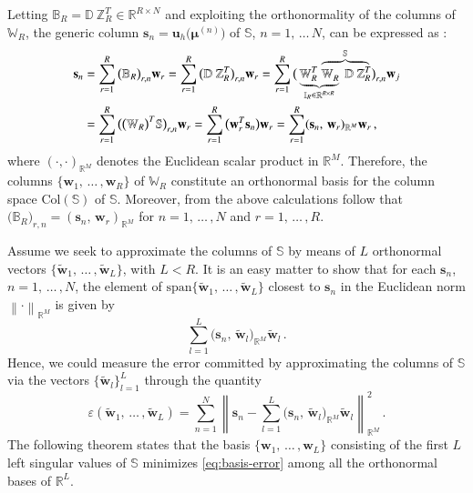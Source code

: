 \documentclass{elsarticle}
\theoremstyle{theorem}
\theoremstyle{definition}
\theoremstyle{remark}
\theoremstyle{proposition}
\numberwithin{figure}{section}
\newcommand{\norm}[1]{\left\lVert#1\right\rVert}
\newcommand{\wt}[1]{\widetilde{#1}}
\newcommand{\bg}[1]{\boldsymbol{#1}}
\begin{document}
		Letting $\mathbb{B}_R^{} = \mathbb{D} ~ \mathbb{Z}_R^T \in \mathbb{R}^{R \times N}$ and exploiting the orthonormality of the columns of $\mathbb{W}_R$, the generic column $\mathbf{s}_n = \mathbf{u}_h \big( \bg{\mu}^{(n)} \big)$ of $\mathbb{S}$, $n = 1, \, \ldots \, N$, can be expressed as \cite{Vol08}:
		\begin{equation*}
			\begin{aligned}
				\mathbf{s}_n & = \sum_{r = 1}^R \big( \mathbb{B}_R \big)_{r,n} \mathbf{w}_r = \sum_{r = 1}^R \big( \mathbb{D} ~ \mathbb{Z}_R^T \big)_{r,n} \mathbf{w}_r = \sum_{r = 1}^R \big( \underbrace{ \mathbb{W}_R^T ~ \lefteqn{\overbrace{\phantom{\mathbb{W}_R ~ \mathbb{D} ~ \mathbb{Z}_R^T}}^{\mathbb{S}}} \mathbb{W}_R^{}}_{\mathbb{I}_R \in \mathbb{R}^{R \times R}} ~ \mathbb{D} ~ \mathbb{Z}_R^T \big)_{r,n} \mathbf{w}_j \\
				& = \sum_{r = 1}^R \big( \big( \mathbb{W}_R \big)^T \mathbb{S} \big)_{r,n} \mathbf{w}_r = \sum_{r = 1}^R \big( \mathbf{w}_r^T \mathbf{s}_n \big) \mathbf{w}_r = \sum_{r = 1}^R (\mathbf{s}_n, \, \mathbf{w}_r)_{\mathbb{R}^M} \mathbf{w}_r \, ,
			\end{aligned}
		\end{equation*}
		where $(\cdot,\cdot)_{\mathbb{R}^M}$ denotes the Euclidean scalar product in $\mathbb{R}^M$. Therefore, the columns $\big\lbrace \mathbf{w}_1, \, \ldots \, , \mathbf{w}_R \big\rbrace$ of $\mathbb{W}_R$ constitute an orthonormal basis for the column space $\text{Col}(\mathbb{S})$ of $\mathbb{S}$. Moreover, from the above calculations follow that $\big( \mathbb{B}_R \big)_{r,n} = (\mathbf{s}_n, \, \mathbf{w}_r)_{\mathbb{R}^M}$ for $n = 1, \, \ldots \, , N$ and $r = 1, \, \ldots \, , R$.
		
		Assume we seek to approximate the columns of $\mathbb{S}$ by means of $L$ orthonormal vectors $\big\lbrace \wt{\mathbf{w}}_1, \, \ldots \, , \wt{\mathbf{w}}_L \big\rbrace$, with $L < R$. It is an easy matter to show that for each $\mathbf{s}_n$, $n = 1, \, \ldots \, , N$, the element of $\text{span} \big\lbrace \wt{\mathbf{w}}_1, \, \ldots \, , \wt{\mathbf{w}}_L \big\rbrace$ closest to $\mathbf{s}_n$ in the Euclidean norm $\norm{\cdot}_{\mathbb{R}^M}$ is given by
		\begin{equation*}
			\sum_{l = 1}^L \big( \mathbf{s}_n, \, \wt{\mathbf{w}}_l \big)_{\mathbb{R}^M} \wt{\mathbf{w}}_l \, .
		\end{equation*} 
		Hence, we could measure the error committed by approximating the columns of $\mathbb{S}$ via the vectors $\big\lbrace \wt{\mathbf{w}}_l \big\rbrace_{l = 1}^L$ through the quantity
		\begin{equation}
			\label{eq:basis-error}
			\varepsilon(\wt{\mathbf{w}}_1, \, \ldots \, , \wt{\mathbf{w}}_L) = \sum_{n = 1}^N \norm{\mathbf{s}_n - \sum_{l = 1}^L \big( \mathbf{s}_n, \, \wt{\mathbf{w}}_l \big)_{\mathbb{R}^M} \wt{\mathbf{w}}_l}_{\mathbb{R}^M}^2 \, .
		\end{equation}
		The following theorem states that the basis $\big\lbrace \mathbf{w}_1, \, \ldots \, , \mathbf{w}_L \big\rbrace$ consisting of the first $L$ left singular values of $\mathbb{S}$ minimizes \eqref{eq:basis-error} among all the orthonormal bases of $\mathbb{R}^L$.
		
\end{document}
